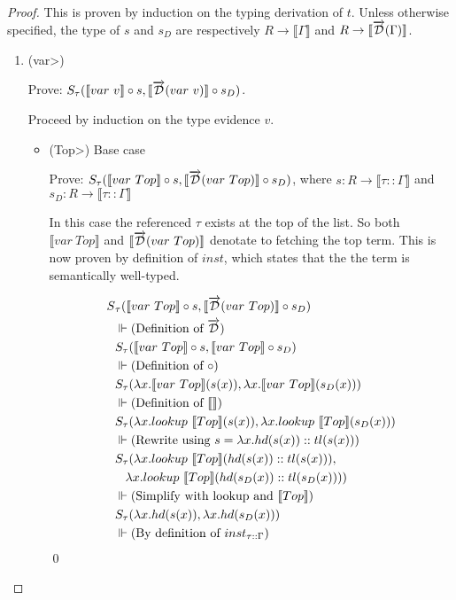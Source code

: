 \documentclass[11pt, final]{article}
\begin{document}
  \begin{proof}

    This is proven by induction on the typing derivation of $t$.
    Unless otherwise specified, the type of $s$ and $s_D$ are respectively $R \rightarrow \llbracket \Gamma \rrbracket$ and $R \rightarrow \llbracket \overrightarrow{\mathcal{D}}(\Gamma) \rrbracket$.
    \begin{enumerate}
      \item (\<var>)

        Prove: $S_\tau(\llbracket var\ v \rrbracket \circ s, \llbracket \overrightarrow{\mathcal{D}}(var\ v) \rrbracket \circ s_D)$.

        Proceed by induction on the type evidence $v$.
        \begin{itemize}
          \item(\<Top>) Base case

          Prove: $S_\tau(\llbracket var\ Top \rrbracket \circ s, \llbracket \overrightarrow{\mathcal{D}}(var\ Top) \rrbracket \circ s_D)$, where $s : R \rightarrow \llbracket \tau :: \Gamma \rrbracket$ and $s_D : R \rightarrow \llbracket \tau :: \Gamma \rrbracket$

          In this case the referenced $\tau$ exists at the top of the list.
          So both $\llbracket var\ Top \rrbracket$ and $\llbracket \overrightarrow{\mathcal{D}}(var\ Top) \rrbracket$ denotate to fetching the top term.
          This is now proven by definition of $inst$, which states that the the term is semantically well-typed.

          \begin{align*}
            S&_\tau(\llbracket var\ Top \rrbracket \circ s, \llbracket \overrightarrow{\mathcal{D}}(var\ Top) \rrbracket \circ s_D) \\
            &\Vdash \text{(Definition of $\overrightarrow{\mathcal{D}}$)} \\
            & S_\tau(\llbracket var\ Top \rrbracket \circ s, \llbracket var\ Top \rrbracket \circ s_D) \\
            &\Vdash \text{(Definition of $\circ$)} \\
            & S_\tau(\lambda x. \llbracket var\ Top \rrbracket (s(x)), \lambda x. \llbracket var\ Top \rrbracket (s_D(x))) \\
            &\Vdash \text{(Definition of $\llbracket\rrbracket$)} \\
            & S_\tau(\lambda x. lookup\ \llbracket Top \rrbracket (s(x)), \lambda x. lookup\ \llbracket Top \rrbracket (s_D(x))) \\
            &\Vdash \text{(Rewrite using $s = \lambda x. hd(s(x))::tl(s(x))$)} \\
            & S_\tau(\lambda x. lookup\ \llbracket Top \rrbracket (hd(s(x))::tl(s(x))), \\
              & \;\;\; \lambda x. lookup\ \llbracket Top \rrbracket (hd(s_D(x))::tl(s_D(x)))) \\
            & \Vdash \text{(Simplify with lookup and $\llbracket Top \rrbracket$)} \\
            & S_\tau(\lambda x. hd(s(x)), \lambda x. hd(s_D(x))) \\
            & \Vdash \text{(By definition of $inst_{\tau::\Gamma}$)} \\
          \end{align*} \qed


\end{itemize}
\end{enumerate}
\end{proof}
\end{document}
